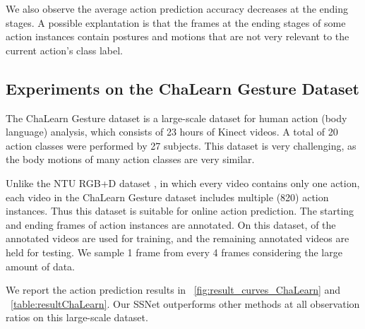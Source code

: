 \documentclass[10pt,twocolumn,letterpaper]{article}
\begin{document}
We also observe the average action prediction accuracy decreases at the ending stages.
A possible explantation is that the frames at the ending stages of some action instances contain postures and motions that are not very relevant to the current action's class label.

\subsection{Experiments on the ChaLearn Gesture Dataset}


The ChaLearn Gesture dataset \cite{escalera2013multi} is a large-scale dataset for human action (body language) analysis,
which consists of 23 hours of Kinect videos.
A total of 20 action classes were performed by 27 subjects.
This dataset is very challenging, as the body motions of many action classes are very similar.


Unlike the NTU RGB+D dataset \cite{Shahroudy_2016_CVPR}, in which every video contains only one action,
each video in the ChaLearn Gesture dataset includes multiple (820) action instances.
Thus this dataset is suitable for online action prediction.
The starting and ending frames of  action instances are annotated.
On this dataset,  of the annotated videos are used for training,
and the remaining annotated videos are held for testing.
We sample 1 frame from every 4 frames considering the large amount of data.

We report the action prediction results in \figurename{~\ref{fig:result_curves_ChaLearn}} and \tablename{~\ref{table:resultChaLearn}}.
Our SSNet outperforms other methods at all observation ratios on this large-scale dataset.
\end{document}
